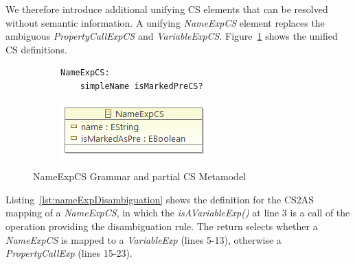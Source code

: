 \documentclass{llncs}
\begin{document}
We therefore introduce additional unifying CS elements that can be resolved without semantic information.  A unifying \emph{NameExpCS} element replaces the ambiguous \emph{PropertyCallExpCS} and \emph{VariableExpCS}.
Figure~\ref{fig:NameExpCS} shows the unified CS definitions.


\begin{figure}[htbp]
\centering
\begin{subfigure}{0.5\textwidth}
  \centering
 \begin{lstlisting}[label=lst:NameExpEBNF, language=Xtext]
 NameExpCS:
 	simpleName isMarkedPreCS?
 \end{lstlisting} 
\end{subfigure}%
\begin{subfigure}{0.5\textwidth}
  \centering
  \includegraphics[scale=0.75]{images/NameExpCS.png}
\end{subfigure}
\caption{NameExpCS Grammar and partial CS Metamodel}
\label{fig:NameExpCS}
\end{figure}

Listing~\ref{lst:nameExpDisambiguation} shows the definition for the CS2AS mapping of a \emph{NameExpCS}, in which the \emph{isAVariableExp()} at line 3 is a call of the operation providing the disambiguation rule. The return selects whether a \emph{NameExpCS} is mapped to a \emph{VariableExp} (lines 5-13), otherwise a  \emph{PropertyCallExp} (lines 15-23).

\end{document}
